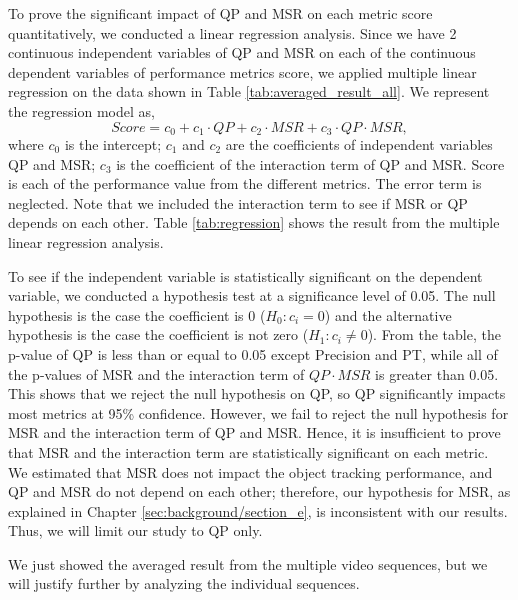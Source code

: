
To prove the significant impact of QP and MSR on each metric score quantitatively, we conducted a linear regression analysis. Since we have 2 continuous independent variables of QP and MSR on each of the continuous dependent variables of performance metrics score, we applied multiple linear regression on the data shown in Table \ref{tab:averaged_result_all}. We represent the regression model as,
\begin{equation}
Score = \mathit{c_0} + \mathit{c_1} \cdot QP + \mathit{c_2} \cdot MSR + \mathit{c_3} \cdot QP \cdot MSR,
\end{equation}
where $\mathit{c_0}$ is the intercept; $\mathit{c_1}$ and $\mathit{c_2}$ are the coefficients of independent variables QP and MSR; $\mathit{c_3}$ is the coefficient of the interaction term of QP and MSR. Score is each of the performance value from the different metrics. The error term is neglected. Note that we included the interaction term to see if MSR or QP depends on each other. Table \ref{tab:regression} shows the result from the multiple linear regression analysis.

To see if the independent variable is statistically significant on the dependent variable, we conducted a hypothesis test at a significance level of 0.05. The null hypothesis is the case the coefficient is 0 ($H_0: c_i = 0$) and the alternative hypothesis is the case the coefficient is not zero ($H_1: c_i \neq 0$). From the table, the p-value of QP is less than or equal to 0.05 except Precision and PT, while all of the p-values of MSR and the interaction term of $QP \cdot MSR$ is greater than 0.05. This shows that we reject the null hypothesis on QP, so QP significantly impacts most metrics at 95\% confidence. However, we fail to reject the null hypothesis for MSR and the interaction term of QP and MSR. Hence, it is insufficient to prove that MSR and the interaction term are statistically significant on each metric. We estimated that MSR does not impact the object tracking performance, and QP and MSR do not depend on each other; therefore, our hypothesis for MSR, as explained in Chapter \ref{sec:background/section_e}, is inconsistent with our results. Thus, we will limit our study to QP only.

We just showed the averaged result from the multiple video sequences, but we will justify further by analyzing the individual sequences.

